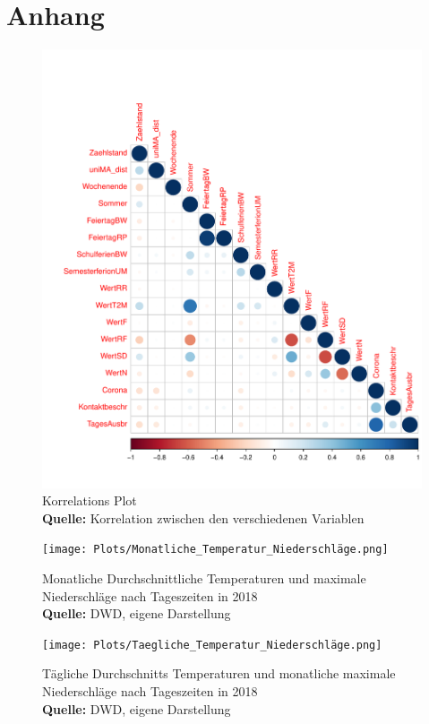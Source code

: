 \documentclass[a4paper,12pt]{thesis}
\newcommand*{\captionsource}[2]{%
	\caption[{#1}]{%
		#1%
		\\\hspace{\linewidth}%
		\textbf{Quelle:} #2%
	}%
}
\begin{document}
\chapter{Anhang}

\begin{figure}[!ht]
	\centering
	\includegraphics[width=\textwidth]{Plots/Corr_Plot.pdf}
	\captionsource{Korrelations Plot}{
		Korrelation zwischen den verschiedenen Variablen
	}
	\label{Figure3}
\end{figure}

\begin{figure}[!ht]
	\centering
	\texttt{[image: Plots/Monatliche\_Temperatur\_Niederschläge.png]}
	\captionsource{Monatliche Durchschnittliche Temperaturen und maximale Niederschläge nach Tageszeiten in 2018}{
		DWD, eigene Darstellung
	}
	\label{Figure4}
\end{figure}

\begin{figure}[!ht]
	\centering
	\texttt{[image: Plots/Taegliche\_Temperatur\_Niederschläge.png]}
	\captionsource{Tägliche Durchschnitts Temperaturen und monatliche maximale Niederschläge nach Tageszeiten in 2018}{
		DWD, eigene Darstellung
	}
	\label{Figure5}
\end{figure}
\end{document}
